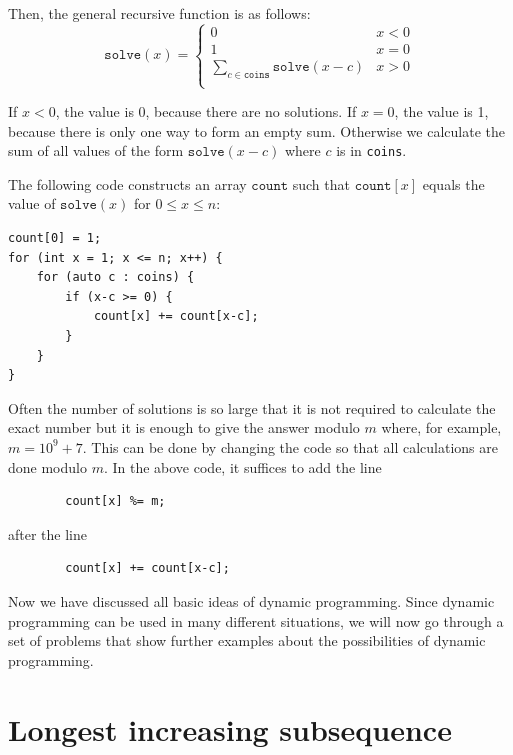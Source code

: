 Then, the general recursive function is as follows:
\begin{equation*}
    \texttt{solve}(x) = \begin{cases}
               0               & x < 0\\
               1               & x = 0\\
               \sum_{c \in \texttt{coins}} \texttt{solve}(x-c) & x > 0 \\
           \end{cases}
\end{equation*}

If $x<0$, the value is 0, because there are no solutions.
If $x=0$, the value is 1, because there is only one way
to form an empty sum.
Otherwise we calculate the sum of all values
of the form $\texttt{solve}(x-c)$ where $c$ is in \texttt{coins}.

The following code constructs an array
$\texttt{count}$ such that
$\texttt{count}[x]$ equals
the value of $\texttt{solve}(x)$
for $0 \le x \le n$:

\begin{lstlisting}
count[0] = 1;
for (int x = 1; x <= n; x++) {
    for (auto c : coins) {
        if (x-c >= 0) {
            count[x] += count[x-c];
        }
    }
}
\end{lstlisting}

Often the number of solutions is so large
that it is not required to calculate the exact number
but it is enough to give the answer modulo $m$
where, for example, $m=10^9+7$.
This can be done by changing the code so that
all calculations are done modulo $m$.
In the above code, it suffices to add the line
\begin{lstlisting}
        count[x] %= m;
\end{lstlisting}
after the line
\begin{lstlisting}
        count[x] += count[x-c];
\end{lstlisting}

Now we have discussed all basic
ideas of dynamic programming.
Since dynamic programming can be used
in many different situations,
we will now go through a set of problems
that show further examples about the
possibilities of dynamic programming.

\section{Longest increasing subsequence}


